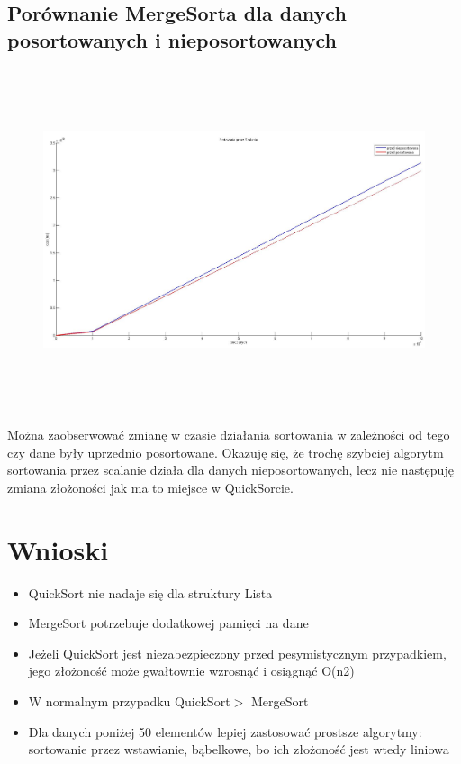 \documentclass[a4paper,11pt]{article}
\begin{document}
\subsection{Porównanie MergeSorta dla danych posortowanych i nieposortowanych}
\begin{center}
\begin{figure}[h!]
\includegraphics[width=12.5cm,height=10cm]{Wykresy2/MergeSortPosortowanaNieposortowana}
\end{figure}
\end{center}
Można zaobserwować zmianę w czasie działania sortowania w zależności od tego czy dane były uprzednio posortowane. Okazuję się, że trochę szybciej algorytm sortowania przez scalanie działa dla danych nieposortowanych, lecz nie następuję zmiana złożoności jak ma to miejsce w QuickSorcie.
\newpage
\section{Wnioski}
\begin{itemize}
\item QuickSort nie nadaje się dla struktury Lista
\item MergeSort potrzebuje dodatkowej pamięci na dane
\item Jeżeli QuickSort jest niezabezpieczony przed pesymistycznym przypadkiem, jego złożoność może gwałtownie wzrosnąć i osiągnąć O(n2)
\item W normalnym przypadku QuickSort$>$ MergeSort
\item Dla danych poniżej 50 elementów lepiej zastosować prostsze algorytmy: sortowanie przez wstawianie, bąbelkowe, bo ich złożoność jest wtedy liniowa
\end{itemize}
\end{document}

